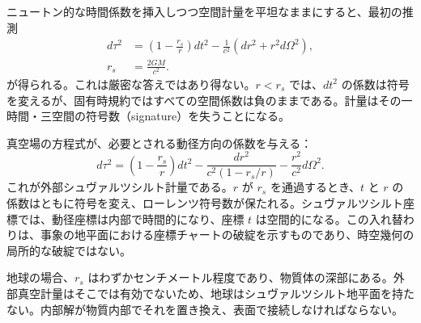 ニュートン的な時間係数を挿入しつつ空間計量を平坦なままにすると、最初の推測
\begin{equation}
\begin{aligned}
d\tau^2
&=\left(1-\frac{r_s}{r}\right)dt^2
-\frac{1}{c^2}\left(dr^2+r^2d\Omega^2\right),\\
r_s&=\frac{2GM}{c^2}.
\end{aligned}
\label{eq:l5-naive-schwarzschild}
\end{equation}
が得られる。これは厳密な答えではあり得ない。\(r<r_s\) では、\(dt^2\) の係数は符号を変えるが、固有時規約ではすべての空間係数は負のままである。計量はその一時間・三空間の符号数（signature）を失うことになる。

真空場の方程式が、必要とされる動径方向の係数を与える：
\begin{equation}
\boxed{
d\tau^2
=\left(1-\frac{r_s}{r}\right)dt^2
-\frac{dr^2}{c^2\left(1-r_s/r\right)}
-\frac{r^2}{c^2}d\Omega^2.
}
\label{eq:l5-schwarzschild}
\end{equation}
これが外部シュヴァルツシルト計量である。\(r\) が \(r_s\) を通過するとき、\(t\) と \(r\) の係数はともに符号を変え、ローレンツ符号数が保たれる。シュヴァルツシルト座標では、動径座標は内部で時間的になり、座標 \(t\) は空間的になる。この入れ替わりは、事象の地平面における座標チャートの破綻を示すものであり、時空幾何の局所的な破綻ではない。

\begin{classroomqa}
\end{classroomqa}

\begin{classroomqa}
\end{classroomqa}

地球の場合、\(r_s\) はわずかセンチメートル程度であり、物質体の深部にある。外部真空計量はそこでは有効でないため、地球はシュヴァルツシルト地平面を持たない。内部解が物質内部でそれを置き換え、表面で接続しなければならない。

